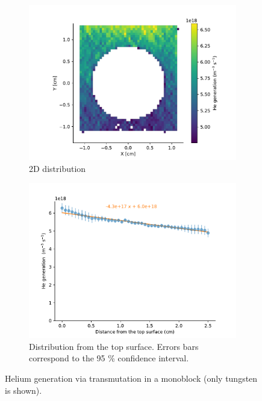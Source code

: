 \begin{figure}
    \centering
    \begin{subfigure}{0.5\linewidth}
        \includegraphics[width=\linewidth]{Figures/Chapter5/helium_transmutation_in_monoblock.pdf}
        \caption{2D distribution}
    \end{subfigure}%
    \begin{subfigure}{0.5\linewidth}
        \includegraphics[width=\linewidth]{Figures/Chapter5/he_generation_distribution.pdf}
        \caption{Distribution from the top surface. Errors bars correspond to the 95 \% confidence interval.}
    \end{subfigure}
    \caption{Helium generation via transmutation in a monoblock (only tungsten is shown).}
\end{figure}

